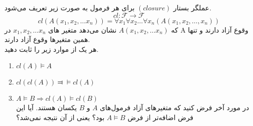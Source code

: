
	عملگر بستار 
	$(closure)$
	برای هر فرمول به صورت زیر تعریف ‌می‌شود. 
	$$cl : \mathcal{F} \longrightarrow \mathcal{F}$$
	$$
		cl(A(x_1, x_2, \dots x_n)) = \forall x_1 \forall x_2 \dots \forall x_n(A(x_1, x_2, \dots, x_n))
	$$
	که
	$A(x_1, x_2, \dots x_n)$
	نشان می‌دهد متغیر های 
	$x_1, x_2, \dots x_n$
	در A وقوع آزاد دارند و تنها همین متغیر‌ها وقوع آزاد دارند.\\
	هر یک از موارد زیر را ثابت دهید.
	\begin{enumerate}[label = (\alph*]
		\LTR
		\item $cl(A) \vDash A$
		\item $cl(cl(A)) \Dashv\vDash cl(A)$
		\item $A \vDash B \Longrightarrow cl(A) \vDash cl(B)$ \\
		\RTL
	 در مورد آخر فرض کنید که متغیر‌های آزاد فرمول‌های  
		$A$
		و 
		$B$
		یکسان هستند.
		آیا این فرض اضافه‌تر از فرض 
		$A \vDash B$
		 بود؟‌ یعنی از آن نتیجه نمی‌شد؟
	\end{enumerate}
 
